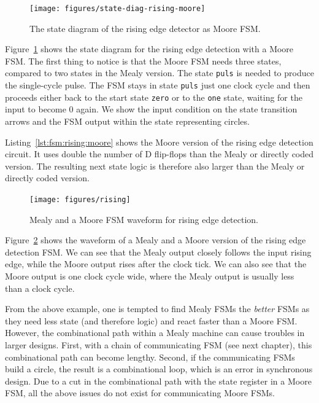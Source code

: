 \documentclass[%
    10pt,
    headinclude, footexclude,
    openright, %
    notitlepage,
    cleardoubleempty,
    headsepline,
    pointlessnumbers,
    bibtotoc, idxtotoc,
    ]{scrbook}
\newcommand{\code}[1]{{\small{\texttt{#1}}}}
\begin{document}
\begin{figure}
  \centering
  \texttt{[image: figures/state-diag-rising-moore]}
  \caption{The state diagram of the rising edge detector as Moore FSM.}
  \label{fig:diag:rising:moore}
\end{figure}

Figure~\ref{fig:diag:rising:moore} shows the state diagram for the rising
edge detection with a Moore FSM. The first thing to notice is that the Moore FSM
needs three states, compared to two states in the Mealy version.
The state \code{puls} is needed to produce the single-cycle pulse.
The FSM stays in state \code{puls} just one clock cycle and then
proceeds either back to the start state \code{zero} or to the \code{one}
state, waiting for the input to become 0 again.
We show the input condition on the state transition arrows and the
FSM output within the state representing circles.


Listing~\ref{lst:fsm:rising:moore} shows the Moore version of the rising edge detection
circuit. It uses double the number of D flip-flops than the Mealy or directly
coded version. The resulting next state logic is therefore also larger
than the Mealy or directly coded version.

\begin{figure}
  \centering
  \texttt{[image: figures/rising]}
  \caption{Mealy and a  Moore FSM waveform for rising edge detection.}
  \label{fig:rising}
\end{figure}

Figure~\ref{fig:rising} shows the waveform of a Mealy and a  Moore version
of the rising edge detection FSM. We can see that the Mealy output closely
follows the input rising edge, while the Moore output rises after the clock tick.
We can also see that the Moore output is one clock cycle wide, where the Mealy
output is usually less than a clock cycle.

From the above example, one is tempted to find Mealy FSMs the \emph{better}
FSMs as they need less state (and therefore logic) and react faster than a Moore FSM.
However, the combinational path within a Mealy machine can cause troubles in
larger designs. First, with a chain of communicating FSM (see next chapter), this
combinational path can become lengthy. Second, if the communicating FSMs build
a circle, the result is a combinational loop, which is an error in synchronous design.
Due to a cut in the combinational path with the state register in a Moore FSM,
all the above issues do not exist for communicating Moore FSMs.
\end{document}
